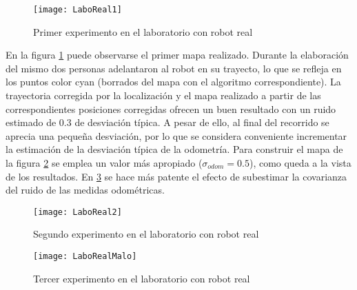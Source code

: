 \begin{figure}[hbt]
  \centering\texttt{[image: LaboReal1]}\\
  \caption{Primer experimento en el laboratorio con robot real}\label{fg:LaboReal1}
\end{figure}

En la figura \ref{fg:LaboReal1} puede observarse el primer mapa realizado. Durante la elaboración del mismo dos personas adelantaron al robot en su trayecto, lo que se refleja en los puntos color cyan (borrados del mapa con el algoritmo correspondiente). La trayectoria corregida por la localización y el mapa realizado a partir de las correspondientes posiciones corregidas ofrecen un buen resultado con un ruido estimado de 0.3 de desviación típica. A pesar de ello, al final del recorrido se aprecia una pequeña desviación, por lo que se considera conveniente incrementar la estimación de la desviación típica de la odometría. Para construir el mapa de la figura \ref{fg:LaboReal2} se emplea un valor más apropiado ($\sigma_{odom}=0.5$), como queda a la vista de los resultados. En \ref{fg:LaboRealMalo} se hace más patente el efecto de subestimar la covarianza del ruido de las medidas odométricas.

\begin{figure}[hbt]
  \centering\texttt{[image: LaboReal2]}\\
  \caption{Segundo experimento en el laboratorio con robot real}\label{fg:LaboReal2}
\end{figure}

\begin{figure}[hbt]
  \centering\texttt{[image: LaboRealMalo]}\\
  \caption{Tercer experimento en el laboratorio con robot real}\label{fg:LaboRealMalo}
\end{figure}


